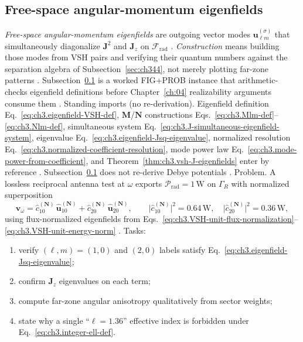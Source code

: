 \subsection{Free-space angular-momentum eigenfields}
\label{sec:ch3101}
\emph{Free-space angular-momentum eigenfields} are outgoing vector modes \(\mathbf{u}_{\ell m}^{(\sigma)}\) that simultaneously
diagonalize \(\mathbf{J}^{2}\) and \(\mathbf{J}_{z}\) on \(\mathcal{F}_{\mathrm{rad}}\) \cite{jackson1999}.
\emph{Construction} means building those modes from VSH pairs and verifying their quantum numbers against the separation algebra of
Subsection~\ref{sec:ch344}, not merely plotting far-zone patterns \cite{hansen1988}. Subsection~\ref{sec:ch3101} is a worked
FIG+PROB instance that arithmetic-checks eigenfield definitions before Chapter~\ref{ch:04} realizability arguments consume them
\cite{harrington2001}.
Standing imports (no re-derivation). Eigenfield definition Eq.~\eqref{eq:ch3.eigenfield-VSH-def}, \(\mathbf{M}\)/\(\mathbf{N}\) constructions
Eqs.~\eqref{eq:ch3.Mlm-def}--\eqref{eq:ch3.Nlm-def}, simultaneous system Eq.~\eqref{eq:ch3.J-simultaneous-eigenfield-system},
eigenvalue Eq.~\eqref{eq:ch3.eigenfield-Jsq-eigenvalue}, normalized resolution Eq.~\eqref{eq:ch3.normalized-coefficient-resolution},
mode power law Eq.~\eqref{eq:ch3.mode-power-from-coefficient}, and Theorem~\ref{thm:ch3.vsh-J-eigenfields} enter by reference
\cite{hansen1988}. Subsection~\ref{sec:ch3101} does not re-derive Debye potentials
\cite{tai1994}.
Problem. A lossless reciprocal antenna test at \(\omega\) exports \(\mathcal{P}_{\mathrm{rad}}=1\,\mathrm{W}\) on \(\Gamma_R\) with normalized
superposition
\begin{equation}
\label{eq:ch3.wp3101-eigenfield-superposition}
\mathbf{v}_\omega
=
\widehat{c}_{10}^{(\mathbf{N})}\,\widehat{\mathbf{u}}_{10}^{(\mathbf{N})}
+
\widehat{c}_{20}^{(\mathbf{N})}\,\widehat{\mathbf{u}}_{20}^{(\mathbf{N})},
\qquad
\bigl|\widehat{c}_{10}^{(\mathbf{N})}\bigr|^{2}=0.64\,\mathrm{W},
\quad
\bigl|\widehat{c}_{20}^{(\mathbf{N})}\bigr|^{2}=0.36\,\mathrm{W},
\end{equation}
using flux-normalized eigenfields from Eqs.~\eqref{eq:ch3.VSH-unit-flux-normalization}--\eqref{eq:ch3.VSH-unit-energy-norm}
\cite{poynting1884}. Tasks:
\begin{enumerate}
\item[(a)] verify \((\ell,m)=(1,0)\) and \((2,0)\) labels satisfy Eq.~\eqref{eq:ch3.eigenfield-Jsq-eigenvalue};
\item[(b)] confirm \(\mathbf{J}_{z}\) eigenvalues on each term;
\item[(c)] compute far-zone angular anisotropy qualitatively from sector weights;
\item[(d)] state why a single ``\(\ell=1.36\)'' effective index is forbidden under Eq.~\eqref{eq:ch3.integer-ell-def}.
\end{enumerate}
